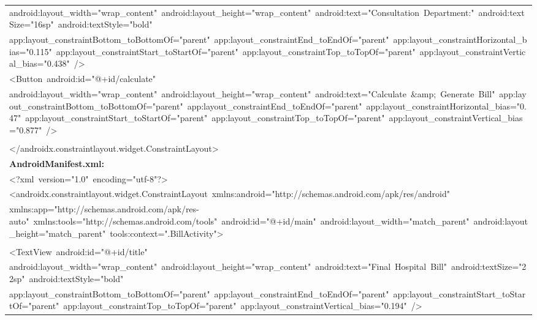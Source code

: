 \documentclass[a4paper,12pt]{article}
\begin{document}
\begin{longtable}{|p{}|}
{\ttfamily\small android:layout\_width="wrap\_content"\ android:layout\_height="wrap\_content"\ android:text="Consultation\ Department:"\ android:textSize="16sp"\ android:textStyle="bold"} \\
{\ttfamily\small app:layout\_constraintBottom\_toBottomOf="parent"\ app:layout\_constraintEnd\_toEndOf="parent"\ app:layout\_constraintHorizontal\_bias="0.115"\ app:layout\_constraintStart\_toStartOf="parent"\ app:layout\_constraintTop\_toTopOf="parent"\ app:layout\_constraintVertical\_bias="0.438"\ /\textgreater{}} \\
{\ttfamily\small \textless{}Button\ android:id="@+id/calculate"} \\
{\ttfamily\small android:layout\_width="wrap\_content"\ android:layout\_height="wrap\_content"\ android:text="Calculate\ \&amp;\ Generate\ Bill"\ app:layout\_constraintBottom\_toBottomOf="parent"\ app:layout\_constraintEnd\_toEndOf="parent"\ app:layout\_constraintHorizontal\_bias="0.47"\ app:layout\_constraintStart\_toStartOf="parent"\ app:layout\_constraintTop\_toTopOf="parent"\ app:layout\_constraintVertical\_bias="0.877"\ /\textgreater{}} \\
\strut \\
{\ttfamily\small \textless{}/androidx.constraintlayout.widget.ConstraintLayout\textgreater{}} \\
\hline
\rule{0pt}{13pt}\textbf{AndroidManifest.xml:} \\
\hline
{\ttfamily\small \textless{}?xml\ version="1.0"\ encoding="utf-8"?\textgreater{}} \\
{\ttfamily\small \textless{}androidx.constraintlayout.widget.ConstraintLayout\ xmlns:android="http://schemas.android.com/apk/res/android"} \\
{\ttfamily\small xmlns:app="http://schemas.android.com/apk/res-auto"\ xmlns:tools="http://schemas.android.com/tools"\ android:id="@+id/main"\ android:layout\_width="match\_parent"\ android:layout\_height="match\_parent"\ tools:context=".BillActivity"\textgreater{}} \\
\strut \\
{\ttfamily\small \textless{}TextView\ android:id="@+id/title"} \\
{\ttfamily\small android:layout\_width="wrap\_content"\ android:layout\_height="wrap\_content"\ android:text="Final\ Hospital\ Bill"\ android:textSize="22sp"\ android:textStyle="bold"} \\
{\ttfamily\small app:layout\_constraintBottom\_toBottomOf="parent"\ app:layout\_constraintEnd\_toEndOf="parent"\ app:layout\_constraintStart\_toStartOf="parent"\ app:layout\_constraintTop\_toTopOf="parent"\ app:layout\_constraintVertical\_bias="0.194"\ /\textgreater{}} \\

\end{longtable}
\end{document}
